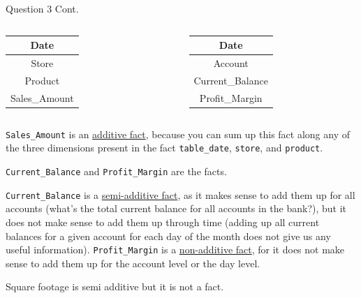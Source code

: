 \begin{frame}[fragile]{Question 3 Cont.}
\vspace{-13pt}
\begin{columns}
\begin{table}[]
	\begin{tabular}{|c|}
		\hline
		Date          \\ \hline
		Store         \\ \hline
		Product       \\ \hline
		Sales\_Amount \\ \hline
	\end{tabular}
\end{table}
\begin{table}[]
	\begin{tabular}{|c|}
		\hline
		Date          \\ \hline
		Account         \\ \hline
		Current\_Balance     \\ \hline
		Profit\_Margin \\ \hline
	\end{tabular}
\end{table}
\end{columns}
\texttt{Sales\_Amount} is an \underline{additive fact}, because you can sum up this fact along any of the three dimensions present in the fact \texttt{table\_date}, \texttt{store}, and \texttt{product}.\\\vspace{3pt}

\texttt{Current\_Balance} and \texttt{Profit\_Margin} are the facts.\\\vspace{3pt}

\texttt{Current\_Balance} is a \underline{semi-additive fact}, as it
makes sense to add them up for all accounts (what's the total current balance for all accounts in the bank?), but it does not make sense to add them up through time (adding up all current balances for a given account for each day of the month does not give us any useful information). \texttt{Profit\_Margin} is a \underline{non-additive fact}, for it does not make sense to add them up for the account level or the day level.\\\vspace{3pt}

Square footage is semi additive but it is not a fact.
\end{frame}

